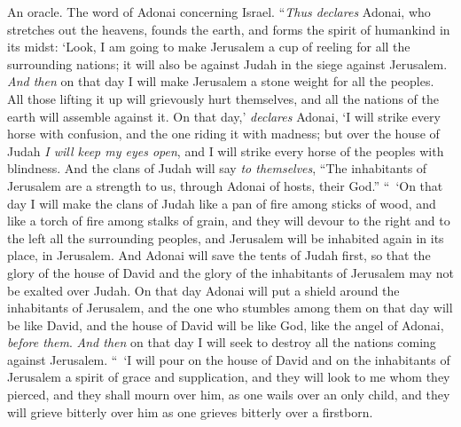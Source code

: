 \begin{biblechapter} %
 An oracle. The word of Adonai concerning Israel. “\textit{Thus declares} Adonai, who stretches out the heavens, founds the earth, and forms the spirit of humankind in its midst:
\verse ‘Look, I am going to make Jerusalem a cup of reeling for all the surrounding nations; it will also be against Judah in the siege against Jerusalem.
\verse \textit{And then} on that day I will make Jerusalem a stone weight for all the peoples. All those lifting it up will grievously hurt themselves, and all the nations of the earth will assemble against it.
\verse On that day,’ \textit{declares} Adonai, ‘I will strike every horse with confusion, and the one riding it with madness; but over the house of Judah \textit{I will keep my eyes open}, and I will strike every horse of the peoples with blindness.
\verse And the clans of Judah will say \textit{to themselves}, “The inhabitants of Jerusalem are a strength to us, through Adonai of hosts, their God.”
\verse “ ‘On that day I will make the clans of Judah like a pan of fire among sticks of wood, and like a torch of fire among stalks of grain, and they will devour to the right and to the left all the surrounding peoples, and Jerusalem will be inhabited again in its place, in Jerusalem.
\verse And Adonai will save the tents of Judah first, so that the glory of the house of David and the glory of the inhabitants of Jerusalem may not be exalted over Judah.
\verse On that day Adonai will put a shield around the inhabitants of Jerusalem, and the one who stumbles among them on that day will be like David, and the house of David will be like God, like the angel of Adonai, \textit{before them}.
\verse \textit{And then} on that day I will seek to destroy all the nations coming against Jerusalem.
\verse “ ‘I will pour on the house of David and on the inhabitants of Jerusalem a spirit of grace and supplication, and they will look to me whom they pierced, and they shall mourn over him, as one wails over an only child, and they will grieve bitterly over him as one grieves bitterly over a firstborn.

\end{biblechapter}
